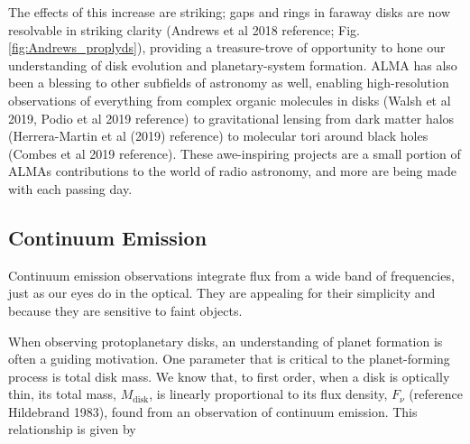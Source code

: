 The effects of this increase are striking; gaps and rings in faraway disks are now resolvable in striking clarity (Andrews et al 2018 reference; Fig. \ref{fig:Andrews_proplyds}), providing a treasure-trove of opportunity to hone our understanding of disk evolution and planetary-system formation. ALMA has also been a blessing to other subfields of astronomy as well, enabling high-resolution observations of everything from complex organic molecules in disks (Walsh et al 2019, Podio et al 2019 reference) to gravitational lensing from dark matter halos (Herrera-Martin et al (2019) reference) to molecular tori around black holes (Combes et al 2019 reference). These awe-inspiring projects are a small portion of ALMAs contributions to the world of radio astronomy, and more are being made with each passing day.






\subsection{Continuum Emission}
\label{section:continuum_emission}

Continuum emission observations integrate flux from a wide band of frequencies, just as our eyes do in the optical. They are appealing for their simplicity and because they are sensitive to faint objects.

When observing protoplanetary disks, an understanding of planet formation is often a guiding motivation. One parameter that is critical to the planet-forming process is total disk mass. We know that, to first order, when a disk is optically thin, its total mass, $M_{\text{disk}}$, is linearly proportional to its flux density, $F_{\nu}$ (reference Hildebrand 1983), found from an observation of continuum emission. This relationship is given by

